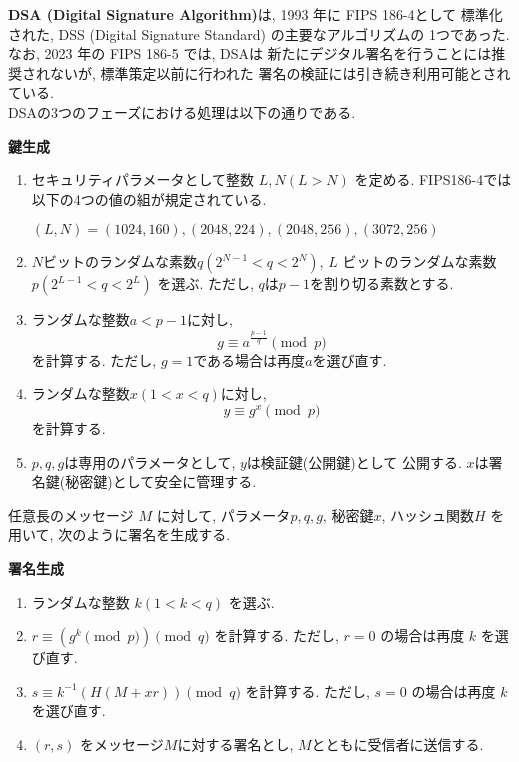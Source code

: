 \indent \textbf{DSA (Digital Signature Algorithm)}は, 1993 年に FIPS 186-4として
標準化された, DSS (Digital Signature Standard) の主要なアルゴリズムの
1つであった. なお, 2023 年の FIPS 186-5\cite{fips186-5} では, DSAは
新たにデジタル署名を行うことには推奨されないが, 標準策定以前に行われた
署名の検証には引き続き利用可能とされている.\\
\indent DSAの3つのフェーズにおける処理は以下の通りである.\\
\let\ltxlist\list
\begin{breakitembox}[l]{\textbf{鍵生成}}
  　
  \begin{enumerate}[parsep=7pt]
    \item セキュリティパラメータとして整数 $L,N (L>N)$ を定める. 
    FIPS186-4では以下の4つの値の組が規定されている.
    \begin{center}
      $(L,N) = (1024,160), (2048,224), (2048,256), (3072,256)$
    \end{center}
    \item $N$ビットのランダムな素数$q(2^{N-1}<q<2^{N})$, 
    $L$ ビットのランダムな素数$p(2^{L-1}<q<2^{L})$ を選ぶ.
    ただし, $q$は$p-1$を割り切る素数とする.
    \item ランダムな整数$a<p-1$に対し,
    \[
      g\equiv a^{\frac{p-1}{q}}\pmod p
    \] 
    を計算する. ただし, $g=1$である場合は再度$a$を選び直す.
    \item ランダムな整数$x(1<x<q)$に対し,
    \[
      y\equiv g^x\pmod p
    \]
    を計算する.
    \item $p,q,g$は専用のパラメータとして, $y$は検証鍵(公開鍵)として
    公開する. $x$は署名鍵(秘密鍵)として安全に管理する.
  \end{enumerate}
\end{breakitembox}
\vspace{1em}
\indent 任意長のメッセージ $M$ に対して, パラメータ$p, q, g$, 秘密鍵$x$, 
ハッシュ関数$H$ を用いて, 次のように署名を生成する.
\vspace{1em}
\let\ltxlist\list
\begin{breakitembox}[l]{\textbf{署名生成}}
  　
  \begin{enumerate}[parsep=7pt]
    \item ランダムな整数 $k(1<k<q)$ を選ぶ.
    \item $r\equiv (g^k\pmod p)\pmod q$ を計算する. 
    ただし, $r=0$ の場合は再度 $k$ を選び直す.
    \item $s\equiv k^{-1}(H(M+xr))\pmod q$ を計算する.
    ただし, $s=0$ の場合は再度 $k$ を選び直す.
    \item $(r,s)$ をメッセージ$M$に対する署名とし, 
    $M$とともに受信者に送信する.
  \end{enumerate}
\end{breakitembox}
